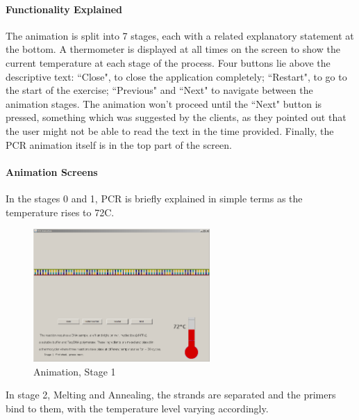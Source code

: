 \paragraph{Functionality Explained}
The animation is split into 7 stages, each with a related explanatory statement at the bottom. A thermometer is displayed at all times on the screen to show the current temperature at each stage of the process. Four buttons lie above the descriptive text: ``Close", to close the application completely; ``Restart", to go to the start of the exercise; ``Previous" and ``Next" to navigate between the animation stages. The animation won't proceed until the ``Next" button is pressed, something which was suggested by the clients, as they pointed out that the user might not be able to read the text in the time provided. Finally, the PCR animation itself is in the top part of the screen.

\paragraph{Animation Screens}

In the stages 0 and 1, PCR is briefly explained in simple terms as the temperature rises to 72\degree C.

\begin{figure}[h]
  \begin{center}
	\includegraphics[width=0.6\textwidth]{./images/AnimImpl/Stage1.png}
    \caption{
      \label{fig:AnimImpl:stage1}
      Animation, Stage 1
    }
  \end{center}
\end{figure}


In stage 2, Melting and Annealing, the strands are separated and the primers bind to them, with the temperature level varying accordingly.

